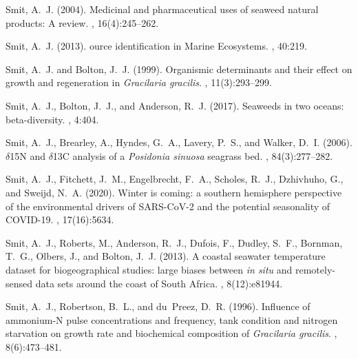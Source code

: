 \begin{thebibliography}{}
  Smit, A.~J. (2004).
  \newblock Medicinal and pharmaceutical uses of seaweed natural products: {A}
    review.
  , 16(4):245--262.
  
  Smit, A.~J. (2013).
  ource identification in {M}arine {E}cosystems.
  , 40:219.
  
  Smit, A.~J. and Bolton, J.~J. (1999).
  \newblock Organismic determinants and their effect on growth and regeneration
    in \emph{Gracilaria gracilis}.
  , 11(3):293--299.
  
  Smit, A.~J., Bolton, J.~J., and Anderson, R.~J. (2017).
  \newblock Seaweeds in two oceans: beta-diversity.
  , 4:404.
  
  Smit, A.~J., Brearley, A., Hyndes, G.~A., Lavery, P.~S., and Walker, D.~I.
    (2006).
  \newblock $\delta$15{N} and $\delta$13{C} analysis of a \emph{Posidonia
    sinuosa} seagrass bed.
  , 84(3):277--282.
  
  Smit, A.~J., Fitchett, J.~M., Engelbrecht, F.~A., Scholes, R.~J., Dzhivhuho,
    G., and Sweijd, N.~A. (2020).
  \newblock Winter is coming: a southern hemisphere perspective of the
    environmental drivers of {SARS-CoV-2} and the potential seasonality of
    {COVID-19}.
  , 17(16):5634.
  
  Smit, A.~J., Roberts, M., Anderson, R.~J., Dufois, F., Dudley, S.~F., Bornman,
    T.~G., Olbers, J., and Bolton, J.~J. (2013).
  \newblock A coastal seawater temperature dataset for biogeographical studies:
    large biases between \emph{in situ} and remotely-sensed data sets around the
    coast of {S}outh {A}frica.
  , 8(12):e81944.
  
  Smit, A.~J., Robertson, B.~L., and du~Preez, D.~R. (1996).
  \newblock Influence of ammonium-{N} pulse concentrations and frequency, tank
    condition and nitrogen starvation on growth rate and biochemical composition
    of \emph{Gracilaria gracilis}.
  , 8(6):473--481.
  

\end{thebibliography}
